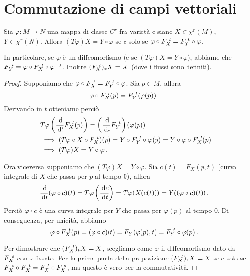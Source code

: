 \section{Commutazione di campi vettoriali}

\begin{lemma} \label{lemma:FlussiEMappe}
	Sia $\varphi:M\to N$ una mappa di classe $C^r$ fra varietà e siano $X\in\chi^r(M)$, $Y\in\chi^r(N)$. Allora $(T\varphi)X=Y\circ \varphi$ se e solo se $\varphi\circ F_{X}^{\ t}=F_{Y}^{\ t}\circ\varphi$.
	
	In particolare, se $\varphi$ è un diffeomorfismo (e se $(T\varphi)X=Y\circ \varphi$), abbiamo che \\
	$F_{Y}^{\ t}=\varphi\circ F_{X}^{\ t}\circ \varphi^{-1}$.
	Inoltre $(F_{X}^{\ t})_*X=X$ (dove i flussi sono definiti).
\end{lemma}

\begin{proof}
	Supponiamo che $\varphi\circ F_{X}^{\ t}=F_{Y}^{\ t}\circ \varphi$. Sia $p\in M$, allora
	\begin{equation*}
		\varphi\circ F_{X}^{\ t}(p)=F_{Y}^{\ t}(\varphi(p))\, \text{. }
	\end{equation*}
	Derivando in $t$ otteniamo perciò
	\begin{align*}
		&T\varphi\left(\frac{\,\mathrm d}{\,\mathrm d t}F_{X}^{\ t}(p)\right)=\left(\frac{\,\mathrm d}{\,\mathrm d t}F_{Y}^{\ t}\right)(\varphi(p))\\
		&\implies (T\varphi\circ X\circ F_{X}^{\ t})(p) = Y \circ F_{Y}^{\ t} \circ \varphi(p) = Y\circ \varphi \circ F_{X}^{\ t}(p) \\
		&\implies (T\varphi) X=Y\circ \varphi\, \text{. }
	\end{align*}
	
	Ora viceversa supponiamo che $(T\varphi)X=Y\circ\varphi$. Sia $c(t)=F_X(p,t)$ (curva integrale di $X$ che passa per $p$ al tempo 0), allora
	\begin{equation*}
		\frac {\,\mathrm d}{\,\mathrm d t}(\varphi\circ c)(t) = T\varphi \left(\frac{\,\mathrm d c}{\,\mathrm d t}\right) = T\varphi(X(c(t))) = Y((\varphi\circ c)(t))\, \text{. }
	\end{equation*}
	Perciò $\varphi\circ c$ è una curva integrale per $Y$ che passa per $\varphi(p)$ al tempo 0. Di conseguenza, per unicità, abbiamo
	\begin{equation*}
		\varphi \circ F_{X}^{\ t} (p) = (\varphi \circ c)(t) = F_Y(\varphi(p),t) = F_{Y}^{\ t} \circ \varphi (p) \, \text{. }
	\end{equation*}
	
	Per dimostrare che $(F_{X}^{\ t})_*X=X$, scegliamo come $\varphi$ il diffeomorfismo dato da $F_{X}^{\ s}$ con $s$ fissato. Per la prima parta della proposizione $(F_{X}^{\ t})_*X=X$ se e solo se $F_{X}^{\ s}\circ F_{X}^{\ t}=F_{X}^{\ t}\circ F_{X}^{\ s}$, ma questo è vero per la commutatività.
\end{proof}

